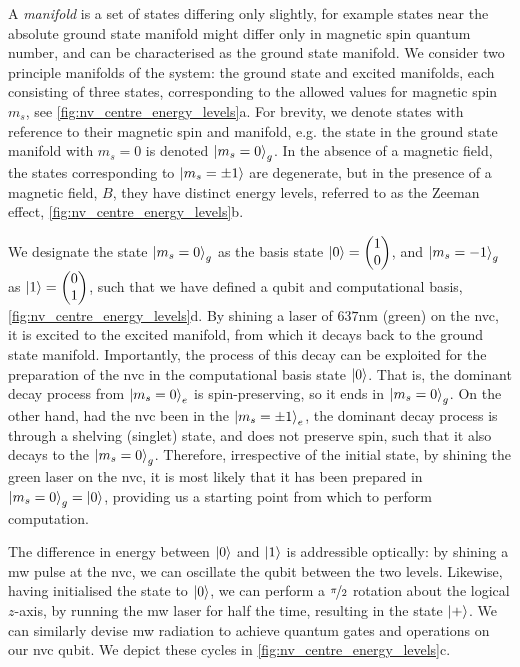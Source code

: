 A \emph{manifold} is a set of states differing only slightly, 
    for example states near the absolute ground state manifold might differ only in magnetic spin quantum number,
    and can be characterised as the ground state manifold. 
We consider two principle manifolds of the system:
    the ground state and excited manifolds, each consisting of 
    three states, corresponding to the allowed values for magnetic spin $m_s$, see \cref{fig:nv_centre_energy_levels}a. 
For brevity, we denote states with reference to their magnetic spin and manifold, 
    e.g. the state in the ground state manifold with $m_s=0$ is denoted $\ket{m_s=0}_g$. 
In the absence of a magnetic field, the states corresponding to $\ket{m_s=\pm1}$ are degenerate, 
    but in the presence of a magnetic field, $B$, they have distinct energy levels, 
    referred to as the Zeeman effect, \cref{fig:nv_centre_energy_levels}b. 
\par 

We designate the state $\ket{m_s=0}_g$ as the basis state $\ket{0}=\left(\begin{matrix}1 \\ 0\end{matrix}\right)$, 
    and $\ket{m_s=-1}_g$ as $\ket{1}=\left(\begin{matrix}0 \\ 1\end{matrix}\right)$, 
    such that we have defined a qubit and computational basis, \cref{fig:nv_centre_energy_levels}d.
By shining a laser of $637$nm (green) on the \gls{nvc}, it is excited to the excited manifold, 
    from which it decays back to the ground state manifold. 
Importantly, the process of this decay can be exploited for the preparation of the \gls{nvc} in 
    the computational basis state $\ket{0}$. 
That is, the dominant decay process from $\ket{m_s=0}_e$ is 
    spin-preserving, so it ends in $\ket{m_s=0}_g$. 
On the other hand, had the \gls{nvc} been in the $\ket{m_s=\pm1}_e$,
    the dominant decay process is through a shelving (singlet) state, 
    and does not preserve spin, such that it also decays to the $\ket{m_s=0}_g$.
Therefore, irrespective of the initial state, 
    by shining the green laser on the \gls{nvc}, 
    it is most likely that it has been prepared in $\ket{m_s=0}_g = \ket{0}$, 
    providing us a starting point from which to perform computation.
\par 

The difference in energy between $\ket{0}$ and $\ket{1}$ is addressible optically: 
    by shining a \gls{mw} pulse at the \gls{nvc}, we can oscillate the qubit between the two levels. 
Likewise, having initialised the state to $\ket{0}$, we can perform a $\nicefrac{\pi}{2}$ rotation 
    about the logical $z$-axis, by running the \gls{mw} laser for half the time, 
    resulting in the state $\ket{+}$. 
We can similarly devise \gls{mw} radiation to achieve quantum gates and operations on our \gls{nvc} qubit.
We depict these cycles in \cref{fig:nv_centre_energy_levels}c. 
\par

